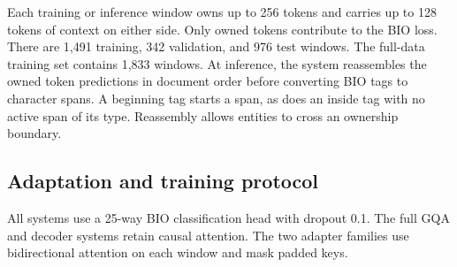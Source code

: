 \documentclass[11pt,a4paper]{article}
\begin{document}
Each training or inference window owns up to 256 tokens and carries up to 128 tokens of context on either side. Only owned tokens contribute to the BIO loss. There are 1,491 training, 342 validation, and 976 test windows. The full-data training set contains 1,833 windows. At inference, the system reassembles the owned token predictions in document order before converting BIO tags to character spans. A beginning tag starts a span, as does an inside tag with no active span of its type. Reassembly allows entities to cross an ownership boundary.

\subsection{Adaptation and training protocol}
All systems use a 25-way BIO classification head with dropout 0.1. The full GQA and decoder systems retain causal attention. The two adapter families use bidirectional attention on each window and mask padded keys.
\end{document}
